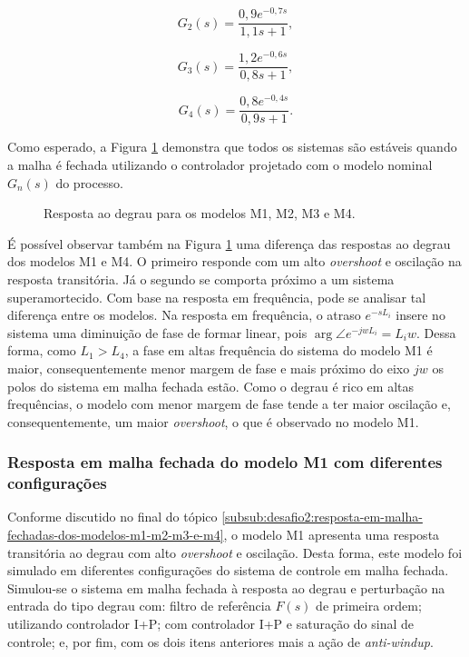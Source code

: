 \begin{equation}
    \label{eq:desafio2:modelo-g2}
    G_{2}(s) = \frac{0,9e^{-0,7s}}{1,1s + 1},
\end{equation}

\begin{equation}
    \label{eq:desafio2:modelo-g3}
    G_{3}(s) = \frac{1,2e^{-0,6s}}{0,8s + 1},
\end{equation}

\begin{equation}
    \label{eq:desafio2:modelo-g4}
    G_{4}(s) = \frac{0,8e^{-0,4s}}{0,9s + 1}.
\end{equation}

Como esperado, a Figura \ref{fig:desafio2:questao5} demonstra que todos os
sistemas são estáveis quando a malha é fechada utilizando o controlador
projetado com o modelo nominal $G_{n}(s)$ do processo.

\begin{figure}[!ht]
    \caption{Resposta ao degrau para os modelos M1, M2, M3 e M4.}
    \vspace{-10pt}
    \hspace{-30pt}
    \label{fig:desafio2:questao5}
    \begin{minipage}{\linewidth}
        
    \end{minipage}
\end{figure}

É possível observar também na Figura \ref{fig:desafio2:questao5} uma diferença
das respostas ao degrau dos modelos M1 e M4. O primeiro responde com um alto
\textit{overshoot} e oscilação na resposta transitória. Já o segundo se comporta
próximo a um sistema superamortecido. Com base na resposta em frequência, pode
se analisar tal diferença entre os modelos. Na resposta em frequência, o atraso
$e^{-sL_{i}}$ insere no sistema uma diminuição de fase de formar linear, pois
$\arg\angle e^{-jwL_{i}} = L_{i}w$. Dessa forma, como $L_{1} > L_{4}$, a fase em
altas frequência do sistema do modelo M1 é maior, consequentemente menor margem
de fase e mais próximo do eixo $jw$ os polos do sistema em malha fechada estão.
Como o degrau é rico em altas frequências, o modelo com menor margem de fase
tende a ter maior oscilação e, consequentemente, um maior \textit{overshoot}, o
que é observado no modelo M1.

\subsubsection{Resposta em malha fechada do modelo M1 com diferentes configurações}
Conforme discutido no final do tópico
\ref{subsub:desafio2:resposta-em-malha-fechadas-dos-modelos-m1-m2-m3-e-m4}, o
modelo M1 apresenta uma resposta transitória ao degrau com alto
\textit{overshoot} e oscilação. Desta forma, este modelo foi simulado em
diferentes configurações do sistema de controle em malha fechada. Simulou-se o
sistema em malha fechada à resposta ao degrau e perturbação na entrada do tipo
degrau com: filtro de referência $F(s)$ de primeira ordem; utilizando
controlador I+P; com controlador I+P e saturação do sinal de controle; e, por
fim, com os dois itens anteriores mais a ação de \textit{anti-windup}.

